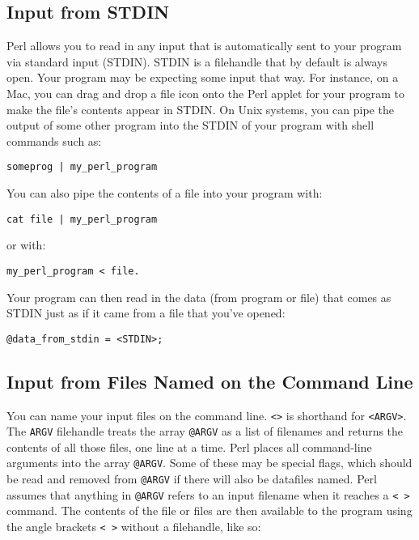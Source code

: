 \subsection{Input from STDIN}
Perl allows you to read in any input that is automatically sent to your program via standard input (STDIN). STDIN is a filehandle that by default is always open. Your program may be expecting some input that way. For instance, on a Mac, you can drag and drop a file icon onto the Perl applet for your program to make the file's contents appear in STDIN. On Unix systems, you can pipe the output of some other program into the STDIN of your program with shell commands such as:

\begin{lstlisting}
someprog | my_perl_program 
\end{lstlisting}

You can also pipe the contents of a file into your program with:

\begin{lstlisting}
cat file | my_perl_program 
\end{lstlisting}

or with:

\begin{lstlisting}
my_perl_program < file.
\end{lstlisting}

Your program can then read in the data (from program or file) that comes as STDIN just as if it came from a file that you've opened:

\begin{lstlisting}
@data_from_stdin = <STDIN>;
\end{lstlisting}

\subsection{Input from Files Named on the Command Line}
You can name your input files on the command line. \verb|<>| is shorthand for \verb|<ARGV>|. The \verb|ARGV| filehandle treats the array \verb|@ARGV| as a list of filenames and returns the contents of all those files, one line at a time. Perl places all command-line arguments into the array \verb|@ARGV|. Some of these may be special flags, which should be read and removed from \verb|@ARGV| if there will also be datafiles named. Perl assumes that anything in \verb|@ARGV| refers to an input filename when it reaches a \verb|< >| command. The contents of the file or files are then available to the program using the angle brackets \verb|< >| without a filehandle, like so:

